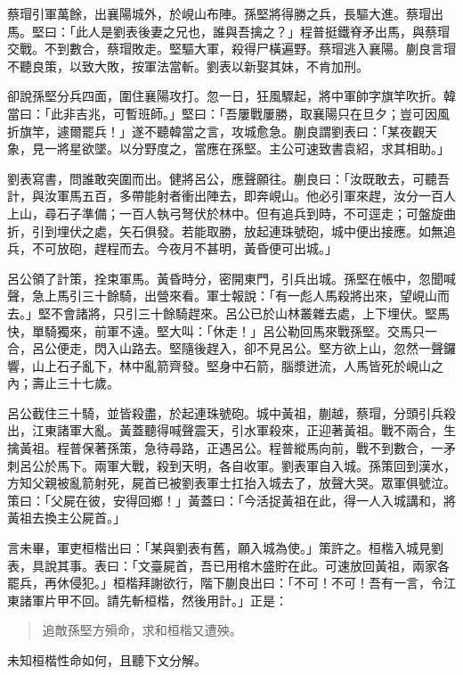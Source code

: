 蔡瑁引軍萬餘，出襄陽城外，於峴山布陣。孫堅將得勝之兵，長驅大進。蔡瑁出馬。堅曰：「此人是劉表後妻之兄也，誰與吾擒之？」程普挺鐵脊矛出馬，與蔡瑁交戰。不到數合，蔡瑁敗走。堅驅大軍，殺得尸橫遍野。蔡瑁逃入襄陽。蒯良言瑁不聽良策，以致大敗，按軍法當斬。劉表以新娶其妹，不肯加刑。

卻說孫堅分兵四面，圍住襄陽攻打。忽一日，狂風驟起，將中軍帥字旗竿吹折。韓當曰：「此非吉兆，可暫班師。」堅曰：「吾屢戰屢勝，取襄陽只在旦夕；豈可因風折旗竿，遽爾罷兵！」遂不聽韓當之言，攻城愈急。蒯良謂劉表曰：「某夜觀天象，見一將星欲墜。以分野度之，當應在孫堅。主公可速致書袁紹，求其相助。」

劉表寫書，問誰敢突圍而出。健將呂公，應聲願往。蒯良曰：「汝既敢去，可聽吾計，與汝軍馬五百，多帶能射者衝出陣去，即奔峴山。他必引軍來趕，汝分一百人上山，尋石子準備；一百人執弓弩伏於林中。但有追兵到時，不可逕走；可盤旋曲折，引到埋伏之處，矢石俱發。若能取勝，放起連珠號砲，城中便出接應。如無追兵，不可放砲，趕程而去。今夜月不甚明，黃昏便可出城。」

呂公領了計策，拴束軍馬。黃昏時分，密開東門，引兵出城。孫堅在帳中，忽聞喊聲，急上馬引三十餘騎，出營來看。軍士報說：「有一彪人馬殺將出來，望峴山而去。」堅不會諸將，只引三十餘騎趕來。呂公已於山林叢雜去處，上下埋伏。堅馬快，單騎獨來，前軍不遠。堅大叫：「休走！」呂公勒回馬來戰孫堅。交馬只一合，呂公便走，閃入山路去。堅隨後趕入，卻不見呂公。堅方欲上山，忽然一聲鑼響，山上石子亂下，林中亂箭齊發。堅身中石箭，腦漿迸流，人馬皆死於峴山之內；壽止三十七歲。

呂公截住三十騎，並皆殺盡，於起連珠號砲。城中黃祖，蒯越，蔡瑁，分頭引兵殺出，江東諸軍大亂。黃蓋聽得喊聲震天，引水軍殺來，正迎著黃祖。戰不兩合，生擒黃祖。程普保著孫策，急待尋路，正遇呂公。程普縱馬向前，戰不到數合，一矛刺呂公於馬下。兩軍大戰，殺到天明，各自收軍。劉表軍自入城。孫策回到漢水，方知父親被亂箭射死，屍首已被劉表軍士扛抬入城去了，放聲大哭。眾軍俱號泣。策曰：「父屍在彼，安得回鄉！」黃蓋曰：「今活捉黃祖在此，得一人入城講和，將黃祖去換主公屍首。」

言未畢，軍吏桓楷出曰：「某與劉表有舊，願入城為使。」策許之。桓楷入城見劉表，具說其事。表曰：「文臺屍首，吾已用棺木盛貯在此。可速放回黃祖，兩家各罷兵，再休侵犯。」桓楷拜謝欲行，階下蒯良出曰：「不可！不可！吾有一言，令江東諸軍片甲不回。請先斬桓楷，然後用計。」正是：

\begin{quote}
追敵孫堅方殞命，求和桓楷又遭殃。
\end{quote}

未知桓楷性命如何，且聽下文分解。
